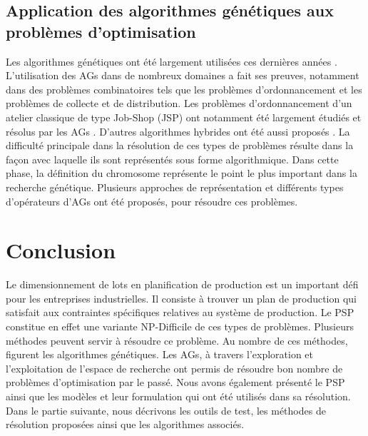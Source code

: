 	\subsection{Application des algorithmes génétiques aux problèmes d'optimisation}
	
	Les algorithmes génétiques ont été largement utilisées ces dernières années \cite{jawahar}. L’utilisation des AGs dans de nombreux domaines a fait ses preuves, notamment dans des problèmes combinatoires tels que les problèmes d’ordonnancement \cite{davis} et les problèmes de collecte et de distribution. Les problèmes d’ordonnancement d’un atelier classique de type Job-Shop (JSP) ont notamment été largement étudiés et résolus par les AGs \cite{boukef}. D’autres algorithmes hybrides ont été aussi proposés \cite{cavalieri}. La difficulté principale dans la résolution de ces types de problèmes résulte dans la façon avec laquelle ils sont représentés sous forme algorithmique. Dans cette phase, la définition du chromosome représente le point le plus important dans la recherche génétique. Plusieurs approches de représentation et différents types d’opérateurs d’AGs ont été proposés, pour résoudre ces problèmes.
	
	\section*{Conclusion}
	Le dimensionnement de lots en planification de production est un important défi pour les entreprises industrielles. Il consiste à trouver un plan de production qui satisfait aux contraintes spécifiques relatives au système de production. Le PSP constitue en effet une variante NP-Difficile de ces types de problèmes. Plusieurs méthodes peuvent servir à résoudre ce problème. Au nombre de ces méthodes, figurent les algorithmes génétiques. Les AGs, à travers l'exploration et l'exploitation de l'espace de recherche ont permis de résoudre bon nombre de problèmes d'optimisation par le passé. Nous avons également présenté le PSP ainsi que les modèles et leur formulation qui ont été utilisés dans sa résolution.	Dans le partie suivante, nous décrivons les outils de test, les méthodes de résolution proposées ainsi que les algorithmes associés.
